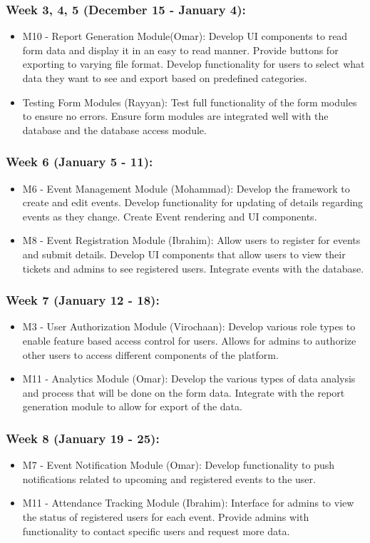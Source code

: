 \documentclass[12pt, titlepage]{article}
\begin{document}
\subsubsection*{Week 3, 4, 5 (December 15 - January 4):} 
\begin{itemize}
  \item M10 - Report Generation Module(Omar): Develop UI components to read form data and display it in an easy to read manner. Provide buttons for exporting to varying file format. Develop functionality for users to select what data they want to see and export based on predefined categories.
  \item Testing Form Modules (Rayyan): Test full functionality of the form modules to ensure no errors. Ensure form modules are integrated well with the database and the database access module.
\end{itemize}
\subsubsection*{Week 6 (January 5 -  11):} 
\begin{itemize}
  \item M6 - Event Management Module (Mohammad): Develop the framework to create and edit events. Develop functionality for updating of details regarding events as they change. Create Event rendering and UI components. 
  \item M8 - Event Registration Module (Ibrahim): Allow users to register for events and submit details. Develop UI components that allow users to view their tickets and admins to see registered users. Integrate events with the database.
\end{itemize}
\subsubsection*{Week 7 (January 12 -  18):} 
\begin{itemize}
  \item M3 - User Authorization Module (Virochaan): Develop various role types to enable feature based access control for users. Allows for admins to authorize other users to access different components of the platform.
  \item M11 - Analytics Module (Omar): Develop the various types of data analysis and process that will be done on the form data. Integrate with the report generation module to allow for export of the data.
\end{itemize}
\subsubsection*{Week 8 (January 19 -  25):} 
\begin{itemize}
  \item M7 - Event Notification Module (Omar): Develop functionality to push notifications related to upcoming and registered events to the user. 
  \item M11 - Attendance Tracking Module (Ibrahim): Interface for admins to view the status of registered users for each event. Provide admins with functionality to contact specific users and request more data. 
\end{itemize}
\end{document}
